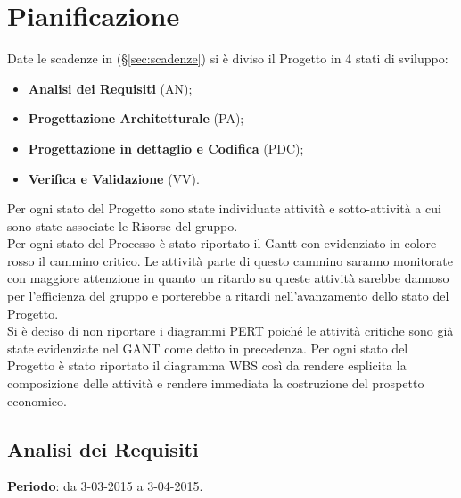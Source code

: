 \section{Pianificazione}{
	Date le scadenze in (\S \ref{sec:scadenze}) si è diviso il Progetto in 4 stati di sviluppo:
	\begin{itemize}
		\item \textbf{Analisi dei Requisiti} (AN);
		\item \textbf{Progettazione Architetturale} (PA);
		\item \textbf{Progettazione in dettaglio e Codifica} (PDC);
		\item \textbf{Verifica e Validazione} (VV).
	\end{itemize}
	
	Per ogni stato del Progetto sono state individuate attività e sotto-attività a cui sono state associate le Risorse del gruppo.\\
	Per ogni stato del Processo è stato riportato il Gantt con evidenziato in colore rosso il cammino critico. Le attività parte di questo cammino saranno monitorate con maggiore attenzione in quanto un ritardo su queste attività	sarebbe dannoso per l'efficienza del gruppo e porterebbe a ritardi nell'avanzamento dello stato del Progetto.\\
	Si è deciso di non riportare i diagrammi PERT poiché le attività critiche sono già state evidenziate nel GANT come detto in precedenza.
	Per ogni stato del Progetto è stato riportato il diagramma WBS così da rendere esplicita la composizione delle attività e rendere immediata la costruzione del prospetto economico.
	
\newpage
\subsection{Analisi dei Requisiti}{
	\textbf{Periodo}: da 3-03-2015 a 3-04-2015. \\
	
}}

